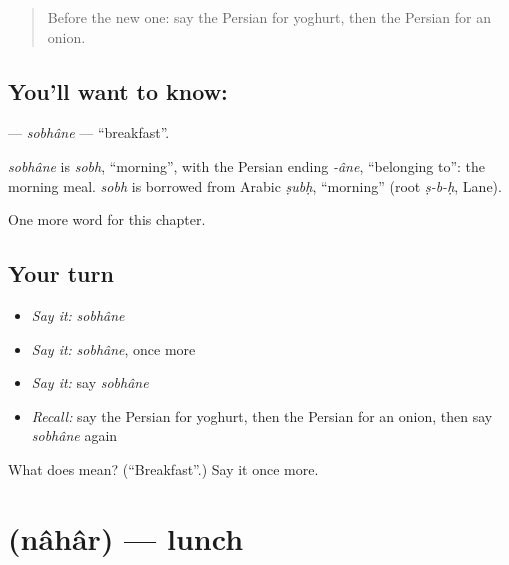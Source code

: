 \label{lesson:FA-C43-sobhane}



\begin{quote}
Before the new one: say the Persian for yoghurt, then the Persian for an onion.
\end{quote}

\subsection*{You'll want to know: }
\textbf{} — \emph{sobhâne} — \textquotedblleft{}breakfast\textquotedblright{}.

\begin{cousinweb}
\emph{sobhâne} is \emph{sobh}, \textquotedblleft{}morning\textquotedblright{}, with the Persian ending \emph{-âne}, \textquotedblleft{}belonging to\textquotedblright{}: the morning meal. \emph{sobh} is borrowed from Arabic \emph{ṣubḥ}, \textquotedblleft{}morning\textquotedblright{} (root \emph{ṣ-b-ḥ}, Lane).
\end{cousinweb}

\begin{grammarlens}[title={What you've built}]
One more word for this chapter.
\end{grammarlens}

\subsection*{Your turn}
\begin{itemize}
\raggedright
  \item \emph{Say it:} \emph{sobhâne}
  \item \emph{Say it:} \emph{sobhâne}, once more
  \item \emph{Say it:} say \emph{sobhâne}
  \item \emph{Recall:} say the Persian for yoghurt, then the Persian for an onion, then say \emph{sobhâne} again
\end{itemize}

\begin{tcolorbox}[breakable,colback=teal!4,colframe=teal!35!black,title={Before you move on}]
What does  mean? (\textquotedblleft{}Breakfast\textquotedblright{}.) Say it once more.
\end{tcolorbox}
\section[\texorpdfstring{\fa{ناهار} (nâhâr)}{ناهار (nâhâr)}]{ (nâhâr) — lunch}

